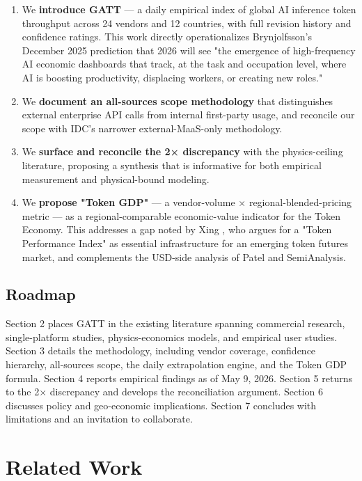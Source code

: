 \documentclass[11pt,a4paper]{article}
\begin{document}
\begin{enumerate}
  \item We \textbf{introduce GATT} --- a daily empirical index of global AI inference token throughput across 24 vendors and 12 countries, with full revision history and confidence ratings. This work directly operationalizes Brynjolfsson's \cite{brynjolfsson2026dashboards} December 2025 prediction that 2026 will see "the emergence of high-frequency AI economic dashboards that track, at the task and occupation level, where AI is boosting productivity, displacing workers, or creating new roles."
  \item We \textbf{document an all-sources scope methodology} that distinguishes external enterprise API calls from internal first-party usage, and reconcile our scope with IDC's narrower external-MaaS-only methodology.
  \item We \textbf{surface and reconcile the 2× discrepancy} with the physics-ceiling literature, proposing a synthesis that is informative for both empirical measurement and physical-bound modeling.
  \item We \textbf{propose "Token GDP"} --- a vendor-volume × regional-blended-pricing metric --- as a regional-comparable economic-value indicator for the Token Economy. This addresses a gap noted by Xing \cite{xing2026token}, who argues for a "Token Performance Index" as essential infrastructure for an emerging token futures market, and complements the USD-side analysis of Patel \cite{patel2026semianalysis} and SemiAnalysis.
\end{enumerate}

\subsection{Roadmap}

Section 2 places GATT in the existing literature spanning commercial research, single-platform studies, physics-economics models, and empirical user studies. Section 3 details the methodology, including vendor coverage, confidence hierarchy, all-sources scope, the daily extrapolation engine, and the Token GDP formula. Section 4 reports empirical findings as of May 9, 2026. Section 5 returns to the 2× discrepancy and develops the reconciliation argument. Section 6 discusses policy and geo-economic implications. Section 7 concludes with limitations and an invitation to collaborate.


\section{Related Work}
\end{document}
